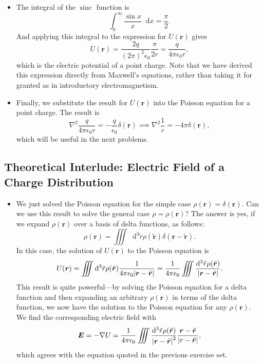 \documentclass[11pt, a4paper]{article}
\newcommand{\diff}{\mathop{}\!\mathrm{d}} %
\renewcommand{\vec}[1]{\bm{#1}} %
\newcommand{\tvec}[1]{\tilde{\vec{#1}}} %
\renewcommand{\r}{\vec{r}}
\newcommand{\ee}{\epsilon_{0}}  %
\renewcommand{\grad}{\nabla}
\renewcommand{\laplacian}{\nabla^{2}}
\begin{document}
\begin{itemize}
	\item The integral of the $ \operatorname{sinc} $ function is
	\begin{equation*}
		\int_{0}^{\infty} \frac{\sin x}{x}\diff x = \frac{\pi}{2}.
	\end{equation*}
    And applying this integral to the expression for $ U(\r) $ gives
	\begin{equation*}
		U(\r) = \frac{2q}{(2\pi)^{2}\ee}\frac{\pi}{2r} = \frac{q}{4\pi \ee r},
	\end{equation*}
	which is the electric potential of a point charge. Note that we have derived this expression directly from Maxwell's equations, rather than taking it for granted as in introductory electromagnetism.
	
	\item Finally, we substitute the result for $ U(\r) $ into the Poisson equation for a point charge. The result is
	\begin{equation*}
		\laplacian \frac{q}{4\pi \ee r} = -\frac{q}{\ee}\delta (\r) \implies \nabla^{2}\frac{1}{r} = - 4\pi \delta(\r),
	\end{equation*}
	which will be useful in the next problems. 
	
\end{itemize}

\subsection{Theoretical Interlude: Electric Field of a Charge Distribution}
\begin{itemize}
	\item We just solved the Poisson equation for the simple case $ \rho(\r) = \delta(\r) $. Can we use this result to solve the general case $ \rho = \rho(\r) $? The answer is yes, if we expand $ \rho(\r) $ over a basis of delta functions, as follows:
	\begin{equation*}
		\rho(\r) = \iiint \diff^{3}\tilde{r} \rho(\tvec{r}) \delta(\r - \tvec{r}).
	\end{equation*}
	In this case, the solution of $ U(\r) $ to the Poisson equation is
	\begin{equation*}
		U(\r) = \iiint \diff^{3}\tilde{r}\rho(\tvec{r}) \frac{1}{4\pi \ee\abs{\r - \tvec{r}}} = \frac{1}{4\pi \ee} \iiint\frac{\diff^{3}\tilde{r}\rho(\tvec{r})}{\abs{\r - \tvec{r}}}.
	\end{equation*}
	This result is quite powerful---by solving the Poisson equation for a delta function and then expanding an arbitrary $ \rho(\r) $ in terms of the delta function, we now have the solution to the Poisson equation for any $ \rho(\r) $. We find the corresponding electric field with
	\begin{equation*}
		\vec{E} = - \grad U = \frac{1}{4\pi \ee} \iiint\frac{\diff^{3}\tilde{r}\rho(\tvec{r})}{\abs{\r - \tvec{r}}^{2}} \frac{\r - \tvec{r}}{\abs{r - \tvec{r}}},
	\end{equation*}
	which agrees with the equation quoted in the previous exercise set.
\end{itemize}
\end{document}
